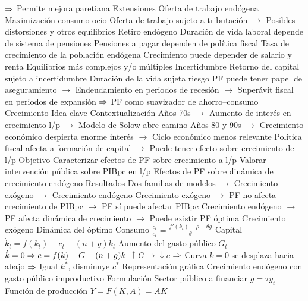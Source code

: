 \documentclass{nuevotema}
\begin{document}
\begin{esquemal}
				\4[] $\Rightarrow$ Permite mejora paretiana
			\3 Extensiones
				\4 Oferta de trabajo endógena
				\4[] Maximización consumo-ocio
				\4[] Oferta de trabajo sujeto a tributación
				\4[] $\to$ Posibles distorsiones y otros equilibrios
				\4 Retiro endógeno
				\4[] Duración de vida laboral depende de sistema de pensiones
				\4[] Pensiones a pagar dependen de política fiscal
				\4 Tasa de crecimiento de la población endógena
				\4[] Crecimiento puede depender de salario y renta
				\4[] Equilibrios más complejos y/o múltiples
				\4 Incertidumbre
				\4[] Retorno del capital sujeto a incertidumbre
				\4[] Duración de la vida sujeta riesgo
				\4[] PF puede tener papel de aseguramiento
				\4[] $\to$ Endeudamiento en periodos de recesión
				\4[] $\to$ Superávit fiscal en periodos de expansión
				\4[] $\Rightarrow$ PF como suavizador de ahorro--consumo
		\2 Crecimiento
			\3 Idea clave
				\4 Contextualización
				\4[] Años 70s
				\4[] $\to$ Aumento de interés en crecimiento l/p
				\4[] $\to$ Modelo de Solow abre camino
				\4[] Años 80 y 90s
				\4[] $\to$ Crecimiento económico despierta enorme interés
				\4[] $\to$ Ciclo económico menos relevante
				\4[] Política fiscal afecta a formación de capital
				\4[] $\to$ Puede tener efecto sobre crecimiento de l/p
				\4 Objetivo
				\4[] Caracterizar efectos de PF sobre crecimiento a l/p
				\4[] Valorar intervención pública sobre PIBpc en l/p
				\4[] Efectos de PF sobre dinámica de crecimiento endógeno
				\4 Resultados
				\4[] Dos familias de modelos
				\4[] $\to$ Crecimiento exógeno
				\4[] $\to$ Crecimiento endógeno
				\4[] Crecimiento exógeno
				\4[] $\to$ PF no afecta crecimiento de PIBpc
				\4[] $\to$ PF sí puede afectar PIBpc
				\4[] Crecimiento endógeno
				\4[] $\to$ PF afecta dinámica de crecimiento
				\4[] $\to$ Puede existir PF óptima
			\3 Crecimiento exógeno
				\4 Dinámica del óptimo
				\4[] Consumo
				\4[] $\frac{\dot{c}_t}{c_t} = \frac{f'(k_t) - \rho - \theta g}{\theta}$
				\4[] Capital
				\4[] $\dot{k}_t = f(k_t) - c_t - (n+g) k_t$
				\4 Aumento del gasto público $G_t$
				\4[] 
				\4[] $\dot{k} = 0 \Rightarrow c = f(k) - G - (n+g)k$
				\4[] $\uparrow G \to \downarrow c$
				\4[] $\Rightarrow$ Curva $\dot{k} = 0$ se desplaza hacia abajo
				\4[] $\Rightarrow$ Igual $k^*$, disminuye $c^*$
				\4 Representación gráfica
				\4[] 
			\3 Crecimiento endógeno con gasto público improductivo
				\4 Formulación
				\4[] Sector público a financiar
				\4[] $g = \tau y_t$
				\4[] Función de producción
				\4[] $Y = F(K, A) = A K$

\end{esquemal}
\end{document}
